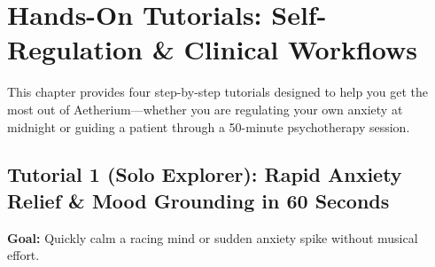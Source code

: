 \documentclass[11pt,oneside,openany]{book}
\begin{document}
\chapter[Hands-On Tutorials]{Hands-On Tutorials: Self-Regulation \& Clinical Workflows}

This chapter provides four step-by-step tutorials designed to help you get the most out of Aetherium---whether you are regulating your own anxiety at midnight or guiding a patient through a 50-minute psychotherapy session.

\section{Tutorial 1 (Solo Explorer): Rapid Anxiety Relief \& Mood Grounding in 60 Seconds}

\textbf{Goal:} Quickly calm a racing mind or sudden anxiety spike without musical effort.
\end{document}
